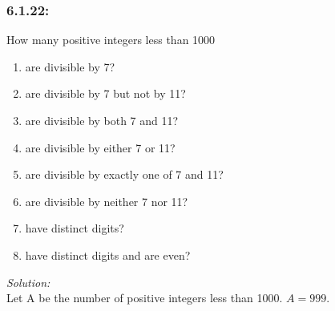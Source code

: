 \documentclass[a4paper]{article}
\begin{document}
	\subsubsection*{6.1.22:} How many positive integers less than 1000
	\begin{enumerate}[label = \textbf{\alph*)}]
	    \item are divisible by 7?
        \item are divisible by 7 but not by 11?
        \item are divisible by both 7 and 11?
        \item are divisible by either 7 or 11?
        \item are divisible by exactly one of 7 and 11?
        \item are divisible by neither 7 nor 11?
        \item have distinct digits?
        \item have distinct digits and are even?
	\end{enumerate}
	\textit{Solution:} \\
	Let A be the number of positive integers less than 1000. $A = 999$.
\end{document}
